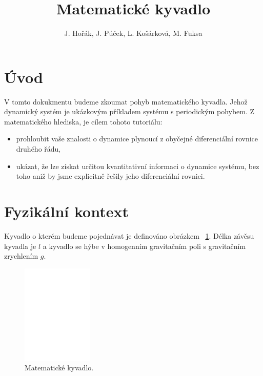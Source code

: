 \documentclass[reqno, a4paper]{amsart}
\author{J. Hořák, J. Púček, L. Košárková, M. Fuksa}
\title{Matematické kyvadlo}
\begin{document}
\begin{abstract}
\end{abstract}

\maketitle

\tableofcontents

\section{Úvod}
\label{sec:Úvod}

V tomto dokukmentu budeme zkoumat pohyb matematického kyvadla. Jehož dynamický systém je ukázkovým příkladem systému s periodickým pohybem. Z matematického hlediska, je cílem tohoto tutoriálu:
\begin{itemize}
\item prohloubit vaše znalosti o dynamice plynoucí z obyčejné diferenciální rovnice druhého řádu,
\item ukázat, že lze získat určitou kvantitativní informaci o dynamice systému, bez toho aniž by jsme explicitně řešily jeho diferenciální rovnici.
\end{itemize}

\section{Fyzikální kontext}
\label{sec:Fyzikální kontext}
Kyvadlo o kterém budeme pojednávat je definováno obrázkem ~\ref{fig:pendulum-intro}. Délka závěsu kyvadla je $l$ a kyvadlo se hýbe v homogenním gravitačním poli s gravitačním zrychlením $g$.

\begin{figure}[h]
\centering
\includegraphics[width=0.3\textwidth]{pendulum-intro}
\caption{Matematické kyvadlo.}  
\label{fig:pendulum-intro}
\end{figure}
\end{document}
